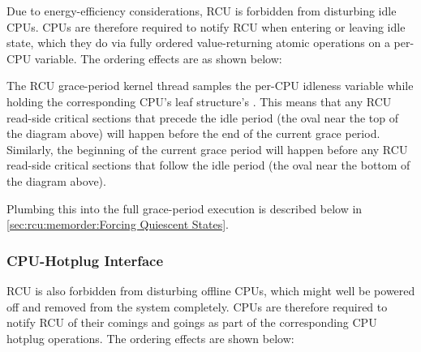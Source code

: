 Due to energy-efficiency considerations, RCU is forbidden from
disturbing idle CPUs.
CPUs are therefore required to notify RCU when
entering or leaving idle state, which they do via fully ordered
value-returning atomic operations on a per-CPU variable.
The ordering
effects are as shown below:

\begin{center}
\end{center}

The RCU grace-period kernel thread samples the per-CPU idleness variable
while holding the corresponding CPU's leaf  structure's
.
This means that any RCU read-side critical sections that
precede the idle period (the oval near the top of the diagram above)
will happen before the end of the current grace period. Similarly, the
beginning of the current grace period will happen before any RCU
read-side critical sections that follow the idle period (the oval near
the bottom of the diagram above).

Plumbing this into the full grace-period execution is described below
in \cref{sec:rcu:memorder:Forcing Quiescent States}.


\subsubsection{CPU-Hotplug Interface}
\label{sec:rcu:memorder:CPU-Hotplug Interface}

RCU is also forbidden from disturbing offline CPUs, which might well be
powered off and removed from the system completely.
CPUs are therefore
required to notify RCU of their comings and goings as part of the
corresponding CPU hotplug operations.
The ordering effects are shown
below:

